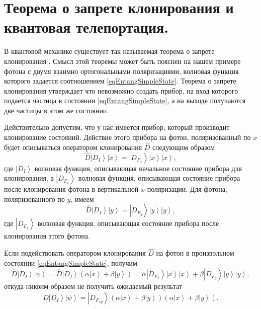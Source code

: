 \section{Теорема о запрете клонирования и квантовая телепортация.}
\label{pPart3EntangleNoClone}
В квантовой механике существует так называемая теорема о запрете
клонирования \cite{bNoClone}. Смысл этой теоремы может быть пояснен на
нашем примере фотона с двумя 
взаимно ортогональными поляризациями, волновая функция которого
задается соотношением \eqref{eqEntangSimpleState}. Теорема о запрете
клонирования  утверждает что невозможно создать прибор, на вход
которого подается частица в состоянии \eqref{eqEntangSimpleState}, 
а на выходе получаются две частицы в этом же состоянии. 

Действительно допустим, что у нас имеется прибор, который производит
клонирование состояний. Действие этого прибора на фотон, поляризованный
по $x$ будет описываться оператором клонирования $\hat{D}$
следующим образом 
\begin{equation}
  \hat{D} \left|D_I\right>\left|x\right> = \left|D_{F_x}\right>\left|x\right>\left|x\right>,
  \nonumber
\end{equation}
где $\left|D_I\right>$ волновая функция, описывающая начальное
состояние прибора для клонирования, а  $\left|D_{F_x}\right>$ волновая
функция, описывающая состояние прибора после клонирования фотона  
в вертикальной $x$-поляризации. Для фотона, поляризованного по $y$, имеем
\begin{equation}
  \hat{D} \left|D_I\right>\left|y\right> = \left|D_{F_y}\right>\left|y\right>\left|y\right>,
  \nonumber
\end{equation}
где $\left|D_{F_y}\right>$ волновая функция, описывающая состояние
прибора после клонирования этого фотона. 

Если подействовать оператором клонирования $\hat{D}$ на фотон в
произвольном состоянии \eqref{eqEntangSimpleState}, получим 
\begin{equation}
  \hat{D} \left|D_I\right>\left|\psi\right> = 
  \hat{D} \left|D_I\right> \left(\alpha \left|x\right> +
  \beta \left|y\right>\right) = 
  \alpha \left|D_{F_x}\right>\left|x\right>\left|x\right> +
  \beta \left|D_{F_y}\right>\left|y\right>\left|y\right>,
  \nonumber
\end{equation}
откуда никоим образом не получить ожидаемый результат
\begin{equation}
  \hat{D} \left|D_I\right>\left|\psi\right> = 
  \left|D_{F_{xy}}\right>  \left(\alpha \left|x\right> +
  \beta \left|y\right>\right)
  \left(\alpha \left|x\right> +
  \beta \left|y\right>\right).
  \nonumber
\end{equation}


